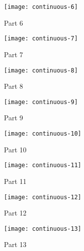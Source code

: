 \begin{figure}[ht]
    \begin{center}
    \texttt{[image: continuous-6]}
    \end{center}
    \caption{Part 6}
    \label{continuous-6}
\end{figure}

\begin{figure}[ht]
    \begin{center}
    \texttt{[image: continuous-7]}
    \end{center}
    \caption{Part 7}
    \label{continuous-7}
\end{figure}

\begin{figure}[ht]
    \begin{center}
    \texttt{[image: continuous-8]}
    \end{center}
    \caption{Part 8}
    \label{continuous-8}
\end{figure}

\begin{figure}[ht]
    \begin{center}
    \texttt{[image: continuous-9]}
    \end{center}
    \caption{Part 9}
    \label{continuous-9}
\end{figure}

\begin{figure}[ht]
    \begin{center}
    \texttt{[image: continuous-10]}
    \end{center}
    \caption{Part 10}
    \label{continuous-10}
\end{figure}

\begin{figure}[ht]
    \begin{center}
    \texttt{[image: continuous-11]}
    \end{center}
    \caption{Part 11}
    \label{continuous-11}
\end{figure}

\begin{figure}[ht]
    \begin{center}
    \texttt{[image: continuous-12]}
    \end{center}
    \caption{Part 12}
    \label{continuous-12}
\end{figure}

\begin{figure}[ht]
    \begin{center}
    \texttt{[image: continuous-13]}
    \end{center}
    \caption{Part 13}
    \label{continuous-13}
\end{figure}

